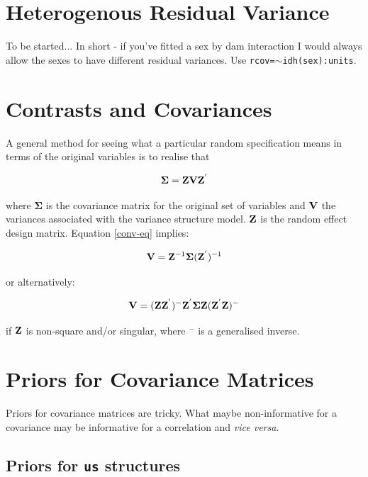 \documentclass{article}
\begin{document}
\pagestyle{headings}

\section{Heterogenous Residual Variance}
\label{heter-sec}
To be started... In short - if you've fitted a sex by dam interaction I would always allow the sexes to have different residual variances. Use \texttt{rcov=$\sim$idh(sex):units}.

\section{Contrasts and Covariances}

A general method for seeing what a particular random specification means in terms of the original variables is to realise that 

\begin{equation}
{\bm \Sigma} = {\bf Z}{\bf V}{\bf Z}^{'}
\label{conv-eq}
\end{equation}

where ${\bm \Sigma}$ is the covariance matrix for the original set of variables and ${\bf V}$ the variances associated with the variance structure model. ${\bf Z}$ is the random effect design matrix. Equation \ref{conv-eq} implies:

\begin{equation}
{\bf V} = {\bf Z}^{-1}{\bm \Sigma}({\bf Z}^{'})^{-1}
\end{equation}

or alternatively: 

\begin{equation}
{\bf V} = ({\bf Z}{\bf Z}^{'})^{-}{\bf Z}^{'}{\bm \Sigma}{\bf Z}({\bf Z}^{'}{\bf Z})^{-}
\end{equation}

if ${\bf Z}$ is non-square and/or singular, where \texttt{$^{-}$} is a generalised inverse.\\

 
\section{Priors for Covariance Matrices}
\label{VCVprior-sec}

Priors for covariance matrices are tricky. What maybe non-informative for a covariance may be informative for a correlation and \emph{vice versa}.

\subsection{Priors for \texttt{us} structures}
\end{document}
